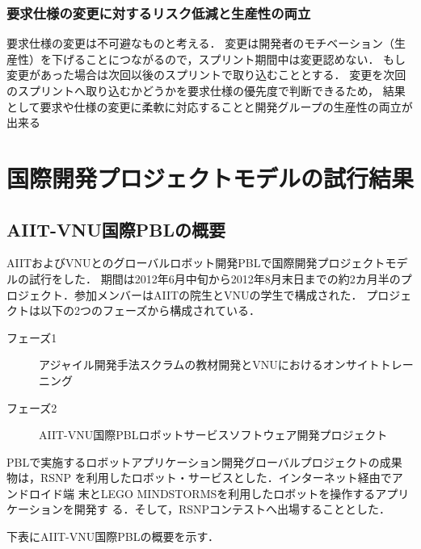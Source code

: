 \documentclass[a4j, 12Q, twocolumn, twoside]{jsarticle}
\begin{document}
\subsubsection{要求仕様の変更に対するリスク低減と生産性の両立}
要求仕様の変更は不可避なものと考える．
変更は開発者のモチベーション（生産性）を下げることにつながるので，スプリント期間中は変更認めない．
もし変更があった場合は次回以後のスプリントで取り込むこととする．
変更を次回のスプリントへ取り込むかどうかを要求仕様の優先度で判断できるため，
結果として要求や仕様の変更に柔軟に対応することと開発グループの生産性の両立が出来る


\section{国際開発プロジェクトモデルの試行結果}\label{sec:result}
\subsection{AIIT-VNU国際PBLの概要}
AIITおよびVNUとのグローバルロボット開発PBLで国際開発プロジェクトモデルの試行をした．
期間は2012年6月中旬から2012年8月末日までの約2カ月半のプロジェクト．参加メンバーはAIITの院生とVNUの学生で構成された．
プロジェクトは以下の2つのフェーズから構成されている．

\begin{description}
\item[フェーズ1] アジャイル開発手法スクラムの教材開発とVNUにおけるオンサイトトレーニング
\item[フェーズ2] AIIT-VNU国際PBLロボットサービスソフトウェア開発プロジェクト
\end{description}

PBLで実施するロボットアプリケーション開発グローバルプロジェクトの成果
物は，RSNP
\cite{narita2011enhanced,kato2011rsi}
を利用したロボット・サービスとした．インターネット経由でアンドロイド端
末とLEGO MINDSTORMSを利用したロボットを操作するアプリケーションを開発す
る．そして，RSNPコンテストへ出場することとした．

下表にAIIT-VNU国際PBLの概要を示す．
\end{document}
